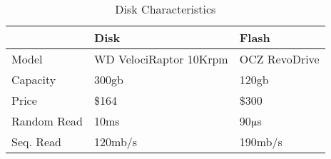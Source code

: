 \begin{table}
  \centering
  \begin{tabular}{ l l l }
  \toprule
   & Disk & Flash \\
   \midrule
   Model & WD VelociRaptor 10Krpm & OCZ RevoDrive \\
   Capacity & 300gb & 120gb \\
   Price & \$164 & \$300 \\
   Random Read & 10ms & 90$\muup$s \\
   Seq. Read & 120mb/s & 190mb/s \\
  \bottomrule
  \end{tabular}

  \caption{Disk Characteristics}
  \label{table::DiskCharacteristics}
\end{table}

